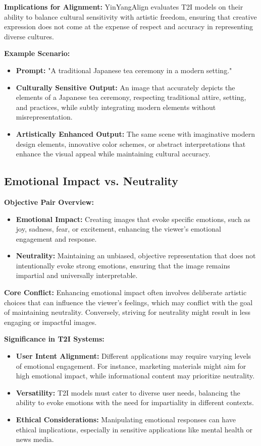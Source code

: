 \textbf{Implications for Alignment:}
YinYangAlign evaluates T2I models on their ability to balance cultural sensitivity with artistic freedom, ensuring that creative expression does not come at the expense of respect and accuracy in representing diverse cultures.

\textbf{Example Scenario:}
\begin{itemize}
    \item \textbf{Prompt:} "A traditional Japanese tea ceremony in a modern setting."
    \item \textbf{Culturally Sensitive Output:} An image that accurately depicts the elements of a Japanese tea ceremony, respecting traditional attire, setting, and practices, while subtly integrating modern elements without misrepresentation.
    \item \textbf{Artistically Enhanced Output:} The same scene with imaginative modern design elements, innovative color schemes, or abstract interpretations that enhance the visual appeal while maintaining cultural accuracy.
\end{itemize}

\subsection{Emotional Impact vs. Neutrality}

\textbf{Objective Pair Overview:}
\begin{itemize}
    \item \textbf{Emotional Impact:} Creating images that evoke specific emotions, such as joy, sadness, fear, or excitement, enhancing the viewer's emotional engagement and response.
    \item \textbf{Neutrality:} Maintaining an unbiased, objective representation that does not intentionally evoke strong emotions, ensuring that the image remains impartial and universally interpretable.
\end{itemize}

\textbf{Core Conflict:}
Enhancing emotional impact often involves deliberate artistic choices that can influence the viewer's feelings, which may conflict with the goal of maintaining neutrality. Conversely, striving for neutrality might result in less engaging or impactful images.

\textbf{Significance in T2I Systems:}
\begin{itemize}
    \item \textbf{User Intent Alignment:} Different applications may require varying levels of emotional engagement. For instance, marketing materials might aim for high emotional impact, while informational content may prioritize neutrality.
    \item \textbf{Versatility:} T2I models must cater to diverse user needs, balancing the ability to evoke emotions with the need for impartiality in different contexts.
    \item \textbf{Ethical Considerations:} Manipulating emotional responses can have ethical implications, especially in sensitive applications like mental health or news media.
\end{itemize}


